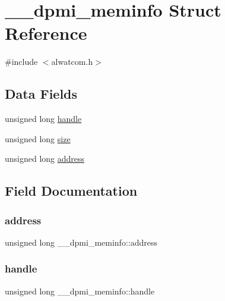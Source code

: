 \hypertarget{struct____dpmi__meminfo}{}\section{\+\_\+\+\_\+dpmi\+\_\+meminfo Struct Reference}
\label{struct____dpmi__meminfo}


{\ttfamily \#include $<$alwatcom.\+h$>$}

\subsection*{Data Fields}
\begin{DoxyCompactItemize}
\item 
unsigned long \hyperlink{struct____dpmi__meminfo_a4d864f748dfa9463207ef86b4241e940}{handle}
\item 
unsigned long \hyperlink{struct____dpmi__meminfo_a9f335d9001c365d1dee9511477543106}{size}
\item 
unsigned long \hyperlink{struct____dpmi__meminfo_ad1af27c3a2d416a0126a0c6a4b029cf3}{address}
\end{DoxyCompactItemize}


\subsection{Field Documentation}
\mbox{\label{struct____dpmi__meminfo_ad1af27c3a2d416a0126a0c6a4b029cf3}} 
\subsubsection{\texorpdfstring{address}{address}}
{\footnotesize\ttfamily unsigned long \+\_\+\+\_\+dpmi\+\_\+meminfo\+::address}

\mbox{\label{struct____dpmi__meminfo_a4d864f748dfa9463207ef86b4241e940}} 
\subsubsection{\texorpdfstring{handle}{handle}}
{\footnotesize\ttfamily unsigned long \+\_\+\+\_\+dpmi\+\_\+meminfo\+::handle}

